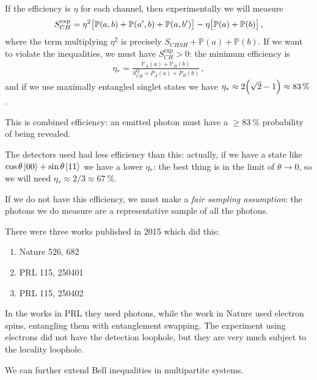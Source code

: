 \documentclass[main.tex]{subfiles}
\begin{document}
If the efficiency is \(\eta \) for each channel, then experimentally we will measure 
%
\begin{align}
S_{CH}^{\text{exp}} = \eta^2 \qty[\mathbb{P}(a, b) 
+ \mathbb{P} (a', b) 
+ \mathbb{P} (a, b') ]
- \eta \qty[\mathbb{P}(a) + \mathbb{P}(b)]
\,,
\end{align}
%
where the term multiplying \(\eta^2\) is precisely \(S_{CHSH}+ \mathbb{P}(a) + \mathbb{P}(b)\). If we want to violate the inequalities, we must have \(S_{CH}^{\text{exp}} > 0\): the minimum efficiency is 
%
\begin{align}
\eta_{*} = \frac{\mathbb{P}_{A}(a) + \mathbb{P}_{B}(b)}{S^{Q}_{CH} + P_{A}(a) + P_{B}(b)}
\,,
\end{align}
%
and if we use maximally entangled singlet states we have \(\eta_{*} \approx 2 \qty(\sqrt{2}-1) \approx \SI{83}{\percent}\). 

This is combined efficiency: an emitted photon must have a \(\geq \SI{83}{\percent}\) probability of being revealed. 

The detectors used had less efficiency than this: actually, if we have a state like \(\cos \theta \ket{00} + \sin \theta \ket{11 }\) we have a lower \(\eta_{*}\): the best thing is in the limit of \(\theta \rightarrow 0\), so we will need \(\eta_{*} \approx 2/3 \approx \SI{67}{\percent}\). 

If we do not have this efficiency, we must make a \emph{fair sampling assumption}: the photons we do measure are a representative sample of all the photons. 

There were three works published in 2015 which did this: 
\begin{enumerate}
  \item Nature 526, 682
  \item PRL 115, 250401
  \item PRL 115, 250402
\end{enumerate}

In the works in PRL they used photons, while the work in Nature used electron spins, entangling them with entanglement swapping. 
The experiment using electrons did not have the detection loophole, but they are very much subject to the locality loophole. 

We can further extend Bell inequalities in multipartite systems. 
\end{document}
